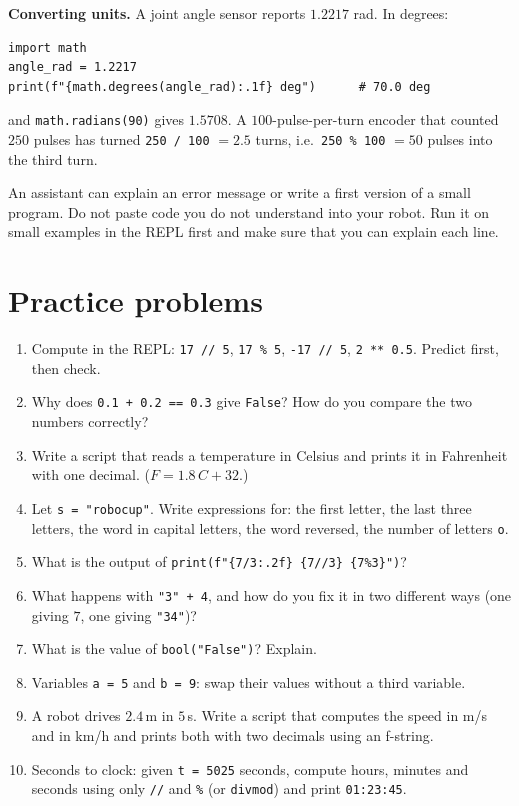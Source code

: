 \begin{example}
\textbf{Converting units.} A joint angle sensor reports $1.2217$ rad. In degrees:
\begin{verbatim}
import math
angle_rad = 1.2217
print(f"{math.degrees(angle_rad):.1f} deg")      # 70.0 deg
\end{verbatim}
and \texttt{math.radians(90)} gives $1.5708$. A $100$-pulse-per-turn encoder that counted $250$ pulses has turned \texttt{250 / 100} $=2.5$ turns, i.e.\ \texttt{250 \% 100} $=50$ pulses into the third turn.
\end{example}

\begin{aibox}
An assistant can explain an error message or write a first version of a small program. Do not paste code you do not understand into your robot. Run it on small examples in the REPL first and make sure that you can explain each line.
\end{aibox}

\section*{Practice problems}
\begin{enumerate}[label=\textbf{\thechapter.\arabic*}]
  \item Compute in the REPL: \texttt{17 // 5}, \texttt{17 \% 5}, \texttt{-17 // 5}, \texttt{2 ** 0.5}. Predict first, then check.
  \item Why does \texttt{0.1 + 0.2 == 0.3} give \texttt{False}? How do you compare the two numbers correctly?
  \item Write a script that reads a temperature in Celsius and prints it in Fahrenheit with one decimal. ($F=1.8\,C+32$.)
  \item Let \texttt{s = "robocup"}. Write expressions for: the first letter, the last three letters, the word in capital letters, the word reversed, the number of letters \texttt{o}.
  \item What is the output of \texttt{print(f"\{7/3:.2f\} \{7//3\} \{7\%3\}")}?
  \item What happens with \texttt{"3" + 4}, and how do you fix it in two different ways (one giving $7$, one giving \texttt{"34"})?
  \item What is the value of \texttt{bool("False")}? Explain.
  \item Variables \texttt{a = 5} and \texttt{b = 9}: swap their values without a third variable.
  \item A robot drives $2.4$\,m in $5$\,s. Write a script that computes the speed in m/s and in km/h and prints both with two decimals using an f-string.
  \item[\textbf{\thechapter.10}$\star$] Seconds to clock: given \texttt{t = 5025} seconds, compute hours, minutes and seconds using only \texttt{//} and \texttt{\%} (or \texttt{divmod}) and print \texttt{01:23:45}.
\end{enumerate}
